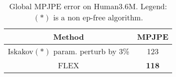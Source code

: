 
\begin{table}[tb]
\color{red}
\begin{center}
\caption{Global MPJPE error on Human3.6M.
Legend:$(*)$ is a non ep-free algorithm.}
\begin{tabular}{|c|c|}
\hline
\textbf{Method} & \textbf{MPJPE} \\ \hline
\makecell{Iskakov\cite{iskakov2019learnable}$(*)$ \\ param. perturb by 3\%} & 123 \\ \hline
FLEX & \textbf{118} \\ \hline

\end{tabular}
\label{tab:global_mpjpe}
\end{center}


\end{table}
